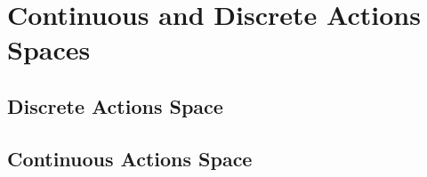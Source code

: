\section{Continuous and Discrete Actions Spaces}

\subsection{Discrete Actions Space}

\subsection{Continuous Actions Space}
